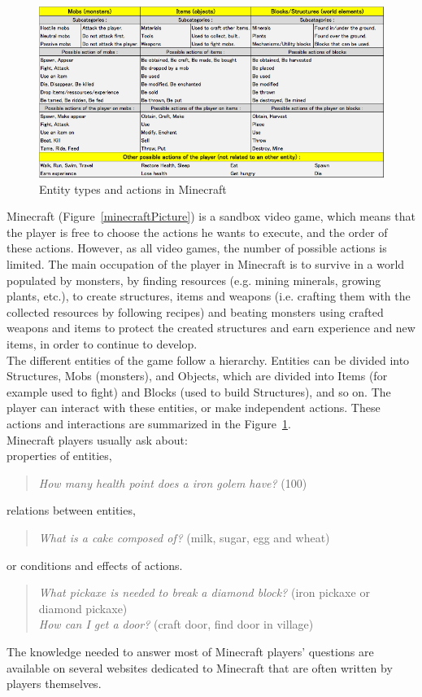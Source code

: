 \documentclass[12pt]{article}
\begin{document}
\begin{figure}[!ht]
	\centering \includegraphics[width=\textwidth]{Figures/Minecraft/tableEntitiesActions.png}
	\caption{\label{minecraftActions}Entity types and actions in Minecraft}
\end{figure}

Minecraft (Figure~\ref{minecraftPicture}) is a sandbox video game, which means that the player is free to choose the actions he wants to execute, and the order of these actions. However, as all video games, the number of possible actions is limited. The main occupation of the player in Minecraft is to survive in a world populated by monsters, by finding resources (e.g. mining minerals, growing plants, etc.), to create structures, items and weapons (i.e. crafting them with the collected resources by following recipes) and beating monsters using crafted weapons and items to protect the created structures and earn experience and new items, in order to continue to develop.\\
The different entities of the game follow a hierarchy. Entities can be divided into Structures, Mobs (monsters), and Objects, which are divided into Items (for example used to fight) and Blocks (used to build Structures), and so on. The player can interact with these entities, or make independent actions. These actions and interactions are summarized in the Figure~\ref{minecraftActions}.\\
Minecraft players usually ask about:\\
properties of entities,
\begin{quote}
\textit{How many health point does a iron golem have?} (100)
\end{quote}
relations between entities,
\begin{quote}
\textit{What is a cake composed of?} (milk, sugar, egg and wheat)
\end{quote}
or conditions and effects of actions.
\begin{quote}
\textit{What pickaxe is needed to break a diamond block?} (iron pickaxe or diamond pickaxe)\\
\textit{How can I get a door?} (craft door, find door in village)
\end{quote}
The knowledge needed to answer most of Minecraft players' questions are available on several websites dedicated to Minecraft that are often written by players themselves.
\end{document}
